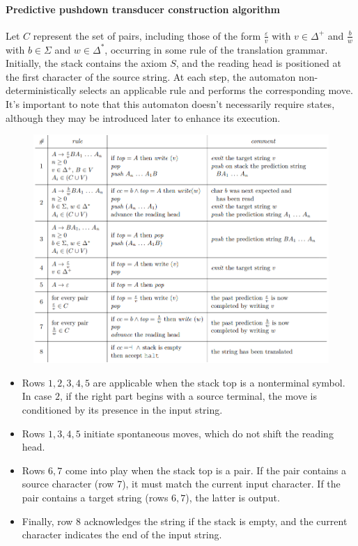 \paragraph*{Predictive pushdown transducer construction algorithm}
Let $C$ represent the set of pairs, including those of the form $\frac{\varepsilon}{v}$ with $v \in \Delta^+$ and $\frac{b}{w}$ with $b \in \Sigma$ and $w \in \Delta^{*}$, occurring in some rule of the translation grammar. 
Initially, the stack contains the axiom $S$, and the reading head is positioned at the first character of the source string. 
At each step, the automaton non-deterministically selects an applicable rule and performs the corresponding move. 
It's important to note that this automaton doesn't necessarily require states, although they may be introduced later to enhance its execution.
\begin{figure}[H]
  \centering
  \includegraphics[width=1\linewidth]{images/trans.png}
\end{figure}

\begin{itemize}
    \item Rows $1, 2, 3, 4, 5$ are applicable when the stack top is a nonterminal symbol.
        In case $2$, if the right part begins with a source terminal, the move is conditioned by its presence in the input string.
    \item Rows $1, 3, 4, 5$ initiate spontaneous moves, which do not shift the reading head.
    \item Rows $6, 7$ come into play when the stack top is a pair.
        If the pair contains a source character (row $7$), it must match the current input character.
        If the pair contains a target string (rows $6, 7$), the latter is output.
    \item Finally, row $8$ acknowledges the string if the stack is empty, and the current character indicates the end of the input string.
\end{itemize}

